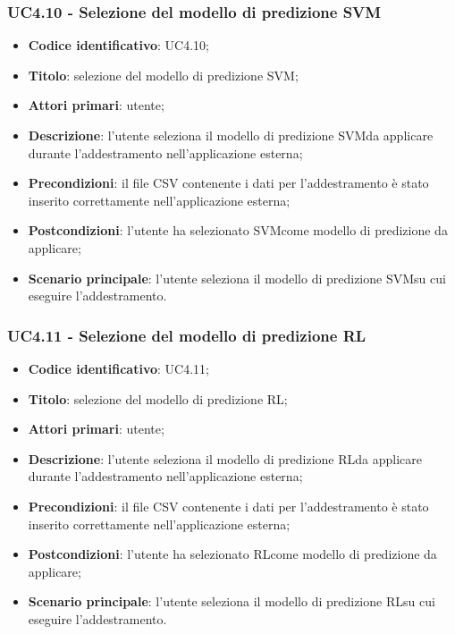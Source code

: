 \subsubsection{UC4.10 - Selezione del modello di predizione SVM}
\begin{itemize}
	\item \textbf{Codice identificativo}: UC4.10;
	\item \textbf{Titolo}: selezione del modello di predizione SVM\glo;
	\item \textbf{Attori primari}: utente;
	\item \textbf{Descrizione}: l'utente seleziona il modello di predizione SVM\glosp da applicare durante l'addestramento nell'applicazione esterna;
	\item \textbf{Precondizioni}: il file CSV contenente i dati per l'addestramento è stato inserito correttamente nell'applicazione esterna;
	\item \textbf{Postcondizioni}: l'utente ha selezionato SVM\glosp come modello di predizione da applicare;
	\item \textbf{Scenario principale}: l'utente seleziona il modello di predizione SVM\glosp su cui eseguire l'addestramento.
\end{itemize}
\subsubsection{UC4.11 - Selezione del modello di predizione RL}
\begin{itemize}
	\item \textbf{Codice identificativo}: UC4.11;
	\item \textbf{Titolo}: selezione del modello di predizione RL\glo;
	\item \textbf{Attori primari}: utente;
	\item \textbf{Descrizione}: l'utente seleziona il modello di predizione RL\glosp da applicare durante l'addestramento nell'applicazione esterna;
	\item \textbf{Precondizioni}: il file CSV contenente i dati per l'addestramento è stato inserito correttamente nell'applicazione esterna;
	\item \textbf{Postcondizioni}: l'utente ha selezionato RL\glosp come modello di predizione da applicare;
	\item \textbf{Scenario principale}: l'utente seleziona il modello di predizione RL\glosp su cui eseguire l'addestramento.
\end{itemize}
